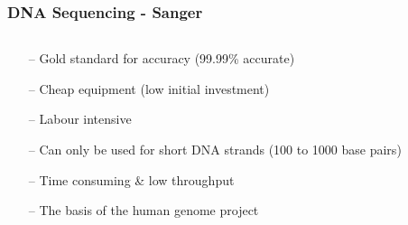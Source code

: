 \documentclass{beamer}
\begin{document}
\begin{frame}
	
	\frametitle{DNA Sequencing - Sanger}
	\small
	\begin{columns}
		\begin{column}{0.5\textwidth}
			\begin{itemize}
				\item[--] Gold standard for accuracy (99.99\% accurate)
			    \item[--] Cheap equipment (low initial investment)
				\item[--] Labour intensive
				\item[--] Can only be used for short DNA strands (100 to 1000 base pairs)
				\item[--] Time consuming \& low throughput
				\item[--] The basis of the human genome project
			\end{itemize}
		\end{column}
		\begin{column}{0.34\textwidth}	

\end{column}
\end{columns}
\end{frame}
\end{document}
